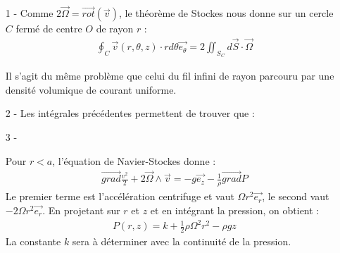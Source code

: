 \documentclass{report}
\begin{document}
\begin{itemize}

	\item[1 - ] Comme $2\vec{\Omega}=\vec{rot}(\vec{v})$, le théorème de Stockes nous donne sur un cercle $C$ fermé de centre $O$ de rayon $r$ : 
	\begin{align*}
		\oint_C \vec{v}(r,\theta,z)\cdot rd\theta\vec{e_\theta}=2\iint_{S_C} d\vec{S}\cdot\vec{\Omega}
	\end{align*}
	
\noindent{}

Il s'agit du même problème que celui du fil infini de rayon parcouru par une densité volumique de courant uniforme.

\item[2 - ] Les intégrales précédentes permettent de trouver que :

\noindent{}
	
\item[3 - ] 	
	
Pour $r<a$, l'équation de Navier-Stockes donne : 
\begin{align*}
\vec{grad}\frac{v^2}{2}+2\vec{\Omega}\wedge\vec{v}=-g\vec{e_z}-\frac{1}{\rho}\vec{grad}P
\end{align*}
	Le premier terme est l'accélération centrifuge et vaut $\Omega r^2\vec{e_r}$, le second vaut $-2\Omega r^2\vec{e_r}$. En projetant sur $r$ et $z$ et en intégrant la pression, on obtient :
	\begin{align*}
		P(r,z) = k + \frac{1}{2}\rho\Omega^2r^2-\rho g z
	\end{align*}
La constante $k$ sera à déterminer avec la continuité de la pression.



\end{itemize}
\end{document}
